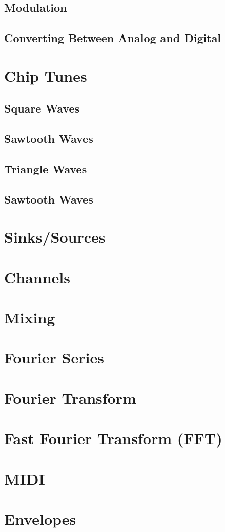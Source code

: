 \documentclass{article}
\begin{document}
\subsection{Modulation}

\subsection{Converting Between Analog and Digital}

\section{Chip Tunes}

\subsection{Square Waves}

\subsection{Sawtooth Waves}

\subsection{Triangle Waves}

\subsection{Sawtooth Waves}

\section{Sinks/Sources}

\section{Channels}

\section{Mixing}

\section{Fourier Series}

\section{Fourier Transform}

\section{Fast Fourier Transform (FFT)}

\section{MIDI}

\section{Envelopes}
\end{document}
